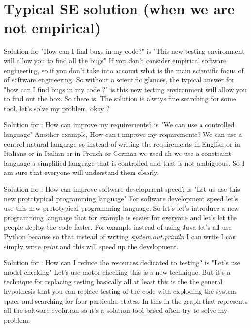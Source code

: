 \documentclass[conference, compsoc, twoside]{IEEEtran}
\begin{document}
\section{Typical SE solution (when we are not empirical)} %
\item Solution for "How can I find bugs in my code?" is "This new testing environment will allow you to find all the bugs"
If you don't consider empirical software engineering, so if you don't take into account what is the main scientific focus of of software engineering. So without a scientific glances, the typical answer for "how can I find bugs in my code ?" is this new testing environment will allow you to find out the box. So there is. The solution is always fine searching for some tool. let's solve my problem, okay ?
\item Solution for : How can improve my requirements? is "We can use a controlled language"
Another example, How can i improve my requirements? 
We can use a control natural language so instead of writing the requirements in English or in Italians or in Italian or in French or German we used ah we use a constraint language a simplified language that is controlled and that is not ambiguous. 
So I am sure that everyone will understand them clearly.
\item Solution for : How can improve software development speed? is "Let us use this new prototypical programming language"
For software development speed let's use this new prototypical programming language.
So let's let's introduce a new programming language that for example is easier for everyone and let's let the people deploy the code faster. 
For example instead of using Java let's all use Python because so that instead of writing \textit{system.out.println} I can write I can simply write \textit{print} and this will speed up the development.
\item Solution for : How can I reduce the resources dedicated to testing? is "Let’s use model checking"
Let's use motor checking this is a new technique. But it's a technique for replacing testing basically all at least this is the the general hypothesis that you can replace testing of the code with exploding the system space and searching for four particular states.
In this in the graph that represents all the software evolution so it's a solution tool based often try to solve my problem.

\end{document}
